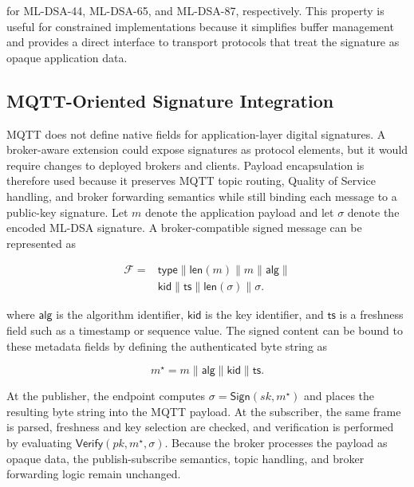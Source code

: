 \documentclass[final, twoside]{IEEEtran} %
\begin{document}
for ML-DSA-44, ML-DSA-65, and ML-DSA-87, respectively. This property is useful for constrained implementations because it simplifies buffer management and provides a direct interface to transport protocols that treat the signature as opaque application data.

\subsection{MQTT-Oriented Signature Integration}

MQTT does not define native fields for application-layer digital signatures. A broker-aware extension could expose signatures as protocol elements, but it would require changes to deployed brokers and clients. Payload encapsulation is therefore used because it preserves MQTT topic routing, Quality of Service handling, and broker forwarding semantics while still binding each message to a public-key signature. Let $m$ denote the application payload and let $\sigma$ denote the encoded ML-DSA signature. A broker-compatible signed message can be represented as

\begin{align}
\mathcal{F} ={}& \mathsf{type} \parallel \mathsf{len}(m) \parallel m \parallel \mathsf{alg} \parallel \\
& \mathsf{kid} \parallel \mathsf{ts} \parallel \mathsf{len}(\sigma) \parallel \sigma.
\label{eq:mqtt-frame}
\end{align}

where $\mathsf{alg}$ is the algorithm identifier, $\mathsf{kid}$ is the key identifier, and $\mathsf{ts}$ is a freshness field such as a timestamp or sequence value. The signed content can be bound to these metadata fields by defining the authenticated byte string as

\begin{equation}
m^{\star} = m \parallel \mathsf{alg} \parallel \mathsf{kid} \parallel \mathsf{ts}.
\label{eq:auth-bytes}
\end{equation}

At the publisher, the endpoint computes $\sigma = \mathsf{Sign}(sk,m^{\star})$ and places the resulting byte string into the MQTT payload. At the subscriber, the same frame is parsed, freshness and key selection are checked, and verification is performed by evaluating $\mathsf{Verify}(pk,m^{\star},\sigma)$. Because the broker processes the payload as opaque data, the publish-subscribe semantics, topic handling, and broker forwarding logic remain unchanged.
\end{document}
